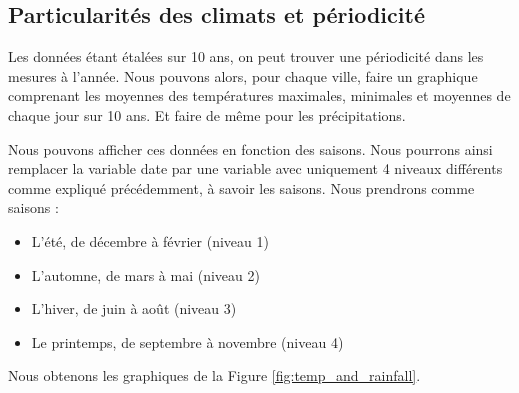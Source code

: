 \documentclass{article}
\begin{document}
\subsection{Particularités des climats et périodicité}

Les données étant étalées sur 10 ans, on peut trouver une périodicité dans les mesures à l'année. Nous pouvons alors, pour chaque ville, faire un graphique comprenant les moyennes des températures maximales, minimales et moyennes de chaque jour sur 10 ans. Et faire de même pour les précipitations. 

Nous pouvons afficher ces données en fonction des saisons. Nous pourrons ainsi remplacer la variable date par une variable avec uniquement 4 niveaux différents comme expliqué précédemment, à savoir les saisons. Nous prendrons comme saisons : 

\begin{itemize}
    \item L’été, de décembre à février (niveau 1)
    \item L’automne, de mars à mai (niveau 2)
    \item L’hiver, de juin à août (niveau 3)
    \item Le printemps, de septembre à novembre (niveau 4)
\end{itemize}

Nous obtenons les graphiques de la Figure \ref{fig:temp_and_rainfall}.
\end{document}

